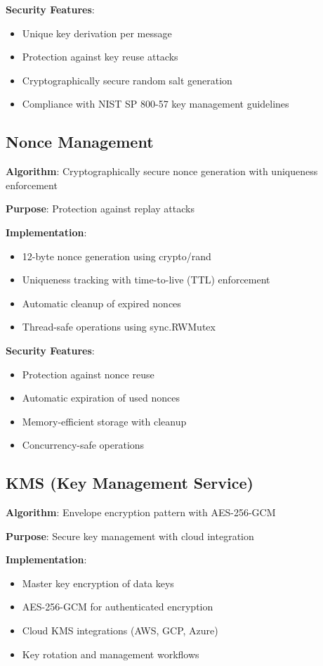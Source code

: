 \documentclass[12pt]{article}
\begin{document}
\textbf{Security Features}:
\begin{itemize}
    \item Unique key derivation per message
    \item Protection against key reuse attacks
    \item Cryptographically secure random salt generation
    \item Compliance with NIST SP 800-57 key management guidelines
\end{itemize}

\subsection{Nonce Management}

\textbf{Algorithm}: Cryptographically secure nonce generation with uniqueness enforcement

\textbf{Purpose}: Protection against replay attacks

\textbf{Implementation}:
\begin{itemize}
    \item 12-byte nonce generation using crypto/rand
    \item Uniqueness tracking with time-to-live (TTL) enforcement
    \item Automatic cleanup of expired nonces
    \item Thread-safe operations using sync.RWMutex
\end{itemize}

\textbf{Security Features}:
\begin{itemize}
    \item Protection against nonce reuse
    \item Automatic expiration of used nonces
    \item Memory-efficient storage with cleanup
    \item Concurrency-safe operations
\end{itemize}

\subsection{KMS (Key Management Service)}

\textbf{Algorithm}: Envelope encryption pattern with AES-256-GCM

\textbf{Purpose}: Secure key management with cloud integration

\textbf{Implementation}:
\begin{itemize}
    \item Master key encryption of data keys
    \item AES-256-GCM for authenticated encryption
    \item Cloud KMS integrations (AWS, GCP, Azure)
    \item Key rotation and management workflows
\end{itemize}
\end{document}

